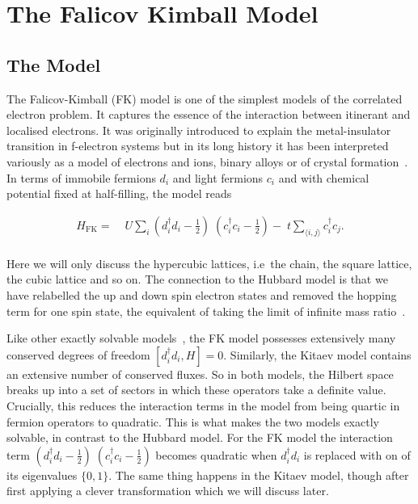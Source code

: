 \hypertarget{the-falicov-kimball-model}{%
\section{The Falicov Kimball Model}\label{the-falicov-kimball-model}}

\hypertarget{the-model}{%
\subsection{The Model}\label{the-model}}

The Falicov-Kimball (FK) model is one of the simplest models of the correlated electron problem. It captures the essence of the interaction between itinerant and localised electrons. It was originally introduced to explain the metal-insulator transition in f-electron systems but in its long history it has been interpreted variously as a model of electrons and ions, binary alloys or of crystal formation~\autocite{hubbardj.ElectronCorrelationsNarrow1963,falicovSimpleModelSemiconductorMetal1969,gruberFalicovKimballModelReview1996,gruberFalicovKimballModel2006}. In terms of immobile fermions \(d_i\) and light fermions \(c_i\) and with chemical potential fixed at half-filling, the model reads

\[\begin{aligned}
H_{\mathrm{FK}} = & \;U \sum_{i} (d^\dagger_{i}d_{i} - \tfrac{1}{2})\;(c^\dagger_{i}c_{i} - \tfrac{1}{2}) -\;t \sum_{\langle i,j\rangle} c^\dagger_{i}c_{j}.\\ 
\end{aligned}\]

Here we will only discuss the hypercubic lattices, i.e~the chain, the square lattice, the cubic lattice and so on. The connection to the Hubbard model is that we have relabelled the up and down spin electron states and removed the hopping term for one spin state, the equivalent of taking the limit of infinite mass ratio~\autocite{devriesSimplifiedHubbardModel1993}.

Like other exactly solvable models~\autocite{smithDisorderFreeLocalization2017}, the FK model possesses extensively many conserved degrees of freedom \([d^\dagger_{i}d_{i}, H] = 0\). Similarly, the Kitaev model contains an extensive number of conserved fluxes. So in both models, the Hilbert space breaks up into a set of sectors in which these operators take a definite value. Crucially, this reduces the interaction terms in the model from being quartic in fermion operators to quadratic. This is what makes the two models exactly solvable, in contrast to the Hubbard model. For the FK model the interaction term \((d^\dagger_{i}d_{i} - \tfrac{1}{2})\;(c^\dagger_{i}c_{i} - \tfrac{1}{2})\) becomes quadratic when \(d^\dagger_{i}d_{i}\) is replaced with on of its eigenvalues \(\{0,1\}\). The same thing happens in the Kitaev model, though after first applying a clever transformation which we will discuss later.

